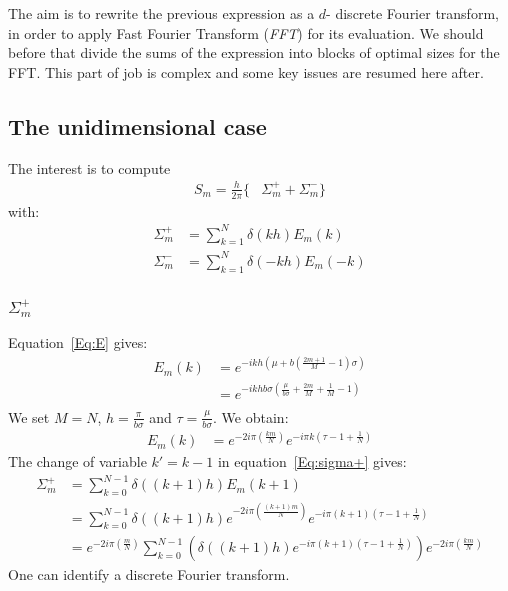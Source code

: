 The aim is to rewrite the previous expression as a $d$- discrete Fourier transform, in order to apply Fast Fourier Transform (\emph{FFT}) for its evaluation.
We should before that divide the sums of the expression into blocks of optimal sizes for the FFT. This part of job is complex and some key issues are resumed here after.

\subsection{The unidimensional case}

The interest is to compute
\begin{align}
S_{m}=\frac{h}{2\pi}\Big\{&\Sigma_{m}^{+} + \Sigma_{m}^{-} \Big\}
\end{align}
with:
\begin{align}
\Sigma_{m}^{+}&=\sum_{k=1}^{N}\delta( kh)E_{m}(k) \label{Eq:sigma+}\\
\Sigma_{m}^{-}&=\sum_{k=1}^{N}\delta(-kh)E_{m}(-k) \label{Eq:sigma-}
\end{align}

\subsubsection{\texorpdfstring{$\Sigma_{m}^{+}$}{sigma+}}
Equation~\eqref{Eq:E} gives:
\begin{align*}
E_{m}(k)&=e^{-ikh\left(\mu+b\left(\frac{2m+1}{M}-1\right)\sigma\right)}\\
&=e^{-ikhb\sigma\left(\frac{\mu}{b\sigma}+\frac{2m}{M}+\frac{1}{M}-1\right)}\\
\end{align*}
We set $M=N$, $h=\frac{\pi}{b\sigma}$ and $\tau=\frac{\mu}{b\sigma}$. We obtain:
\begin{align}
E_{m}(k)&=e^{-2i\pi\left(\frac{k m}{N}\right)}e^{-i\pi k\left(\tau-1+\frac{1}{N}\right)} \label{Eq:E1d}
\end{align}
The change of variable $k'=k-1$ in equation~\eqref{Eq:sigma+} gives:
\begin{align*}
\Sigma_{m}^{+}&=\sum_{k=0}^{N-1}\delta((k+1)h)E_{m}(k+1)\\
  &=\sum_{k=0}^{N-1}\delta((k+1)h) e^{-2i\pi\left(\frac{(k+1) m}{N}\right)} e^{-i\pi (k+1)\left(\tau-1+\frac{1}{N}\right)}\\
  &=e^{-2i\pi\left(\frac{m}{N}\right)} \sum_{k=0}^{N-1}\left(\delta((k+1)h) e^{-i\pi (k+1)\left(\tau-1+\frac{1}{N}\right)}\right) e^{-2i\pi\left(\frac{k m}{N}\right)} 
\end{align*}
One can identify a discrete Fourier transform.

